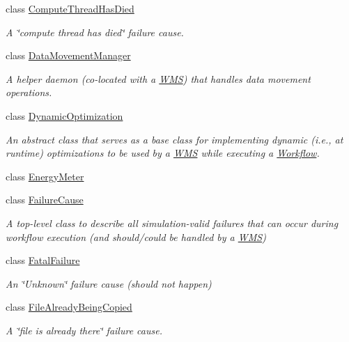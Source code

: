 \begin{DoxyCompactItemize}
class \hyperlink{classwrench_1_1_compute_thread_has_died}{Compute\+Thread\+Has\+Died}
\begin{DoxyCompactList}\small\item\em A \char`\"{}compute thread has died\char`\"{} failure cause. \end{DoxyCompactList}\item 
class \hyperlink{classwrench_1_1_data_movement_manager}{Data\+Movement\+Manager}
\begin{DoxyCompactList}\small\item\em A helper daemon (co-\/located with a \hyperlink{classwrench_1_1_w_m_s}{W\+MS}) that handles data movement operations. \end{DoxyCompactList}\item 
class \hyperlink{classwrench_1_1_dynamic_optimization}{Dynamic\+Optimization}
\begin{DoxyCompactList}\small\item\em An abstract class that serves as a base class for implementing dynamic (i.\+e., at runtime) optimizations to be used by a \hyperlink{classwrench_1_1_w_m_s}{W\+MS} while executing a \hyperlink{classwrench_1_1_workflow}{Workflow}. \end{DoxyCompactList}\item 
class \hyperlink{classwrench_1_1_energy_meter}{Energy\+Meter}
\item 
class \hyperlink{classwrench_1_1_failure_cause}{Failure\+Cause}
\begin{DoxyCompactList}\small\item\em A top-\/level class to describe all simulation-\/valid failures that can occur during workflow execution (and should/could be handled by a \hyperlink{classwrench_1_1_w_m_s}{W\+MS}) \end{DoxyCompactList}\item 
class \hyperlink{classwrench_1_1_fatal_failure}{Fatal\+Failure}
\begin{DoxyCompactList}\small\item\em An \char`\"{}\+Unknown\char`\"{} failure cause (should not happen) \end{DoxyCompactList}\item 
class \hyperlink{classwrench_1_1_file_already_being_copied}{File\+Already\+Being\+Copied}
\begin{DoxyCompactList}\small\item\em A \char`\"{}file is already there\char`\"{} failure cause. \end{DoxyCompactList}\item 

\end{DoxyCompactItemize}

